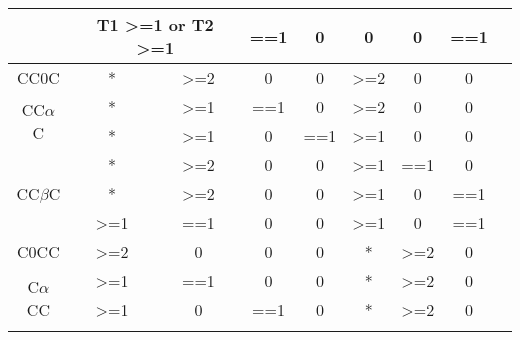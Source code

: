 \documentclass[fleqn]{article}
\begin{document}
\begin {table} [h]
\begin{tabular}{|c|c|c|c|c|c|c|c|c|}
                             & \multicolumn{2}{c|}{T1 \textgreater{}=1 or T2 \textgreater{}=1} & ==1              & 0   & 0                                & 0                               & ==1              \\ \hline
CC0C                         & *                              & \textgreater{}=2               & 0                & 0   & \textgreater{}=2                 & 0                               & 0                \\ \hline
\multirow{2}{*}{CC$\alpha$C} & *                              & \textgreater{}=1               & ==1              & 0   & \textgreater{}=2                 & 0                               & 0                \\ \cline{2-8} 
                             & *                              & \textgreater{}=1               & 0                & ==1 & \textgreater{}=1                 & 0                               & 0                \\ \hline
\multirow{3}{*}{CC$\beta$C}  & *                              & \textgreater{}=2               & 0                & 0   & \textgreater{}=1                 & ==1                             & 0                \\ \cline{2-8} 
                             & *                              & \textgreater{}=2               & 0                & 0   & \textgreater{}=1                 & 0                               & ==1              \\ \cline{2-8} 
                             & \textgreater{}=1               & ==1                            & 0                & 0   & \textgreater{}=1                 & 0                               & ==1              \\ \hline
C0CC                         & \textgreater{}=2               & 0                              & 0                & 0   & *                                & \textgreater{}=2                & 0                \\ \hline
\multirow{4}{*}{C$\alpha$CC} & \textgreater{}=1               & ==1                            & 0                & 0   & *                                & \textgreater{}=2                & 0                \\ \cline{2-8} 
                             & \textgreater{}=1               & 0                              & ==1              & 0   & *                                & \textgreater{}=2                & 0                \\ \cline{2-8} 

\end{tabular}
\end{table}
\end{document}
